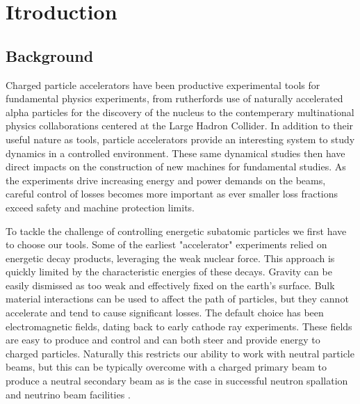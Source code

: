 \chapter{Itroduction} \label{chap:intro}

\section{Background} \label{sec:back}
Charged particle accelerators have been productive experimental tools for fundamental physics experiments, from rutherfords use of naturally accelerated alpha particles for the discovery of the nucleus to the contemperary multinational physics collaborations centered at the Large Hadron Collider.  In addition to their useful nature as tools, particle accelerators provide an interesting system to study dynamics in a controlled environment. These same dynamical studies then have direct impacts on the construction of new machines for fundamental studies. As the experiments drive increasing energy and power demands on the beams, careful control of losses becomes more important as ever smaller loss fractions exceed safety and machine protection limits.

To tackle the challenge of controlling energetic subatomic particles we first have to choose our tools. Some of the earliest "accelerator" experiments relied on energetic decay products, leveraging the weak nuclear force. This approach is quickly limited by the characteristic energies of these decays. Gravity can be easily dismissed as too weak and effectively fixed on the earth's surface. Bulk material interactions can be used to affect the path of particles, but they cannot accelerate and tend to cause significant losses. The default choice has been electromagnetic fields, dating back to early cathode ray experiments. These fields are easy to produce and control and can both steer and provide energy to charged particles. Naturally this restricts our ability to work with neutral particle beams, but this can be typically overcome with a charged primary beam to produce a neutral secondary beam as is the case in successful neutron spallation and neutrino beam facilities \cite{SNS} \cite{NuMI}.

